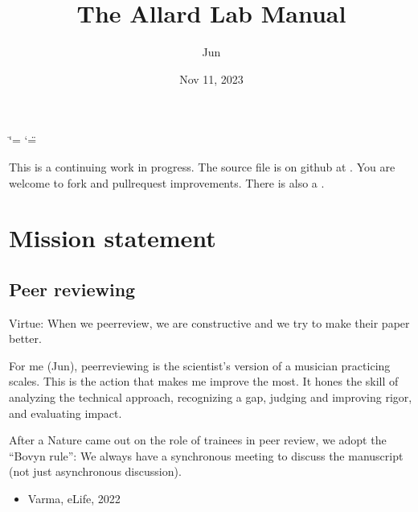 \documentclass[letterpaper,10pt,english]{sphinxmanual}
\title{The Allard Lab Manual}
\date{Nov 11, 2023}
\author{Jun}
\begin{document}
\ifdefined\shorthandoff
  \ifnum\catcode`\=\string=\active\shorthandoff{=}\fi
  \ifnum\catcode`\"=\active{}\fi
\fi

\pagestyle{empty}
\sphinxmaketitle
\pagestyle{plain}
\sphinxtableofcontents
\pagestyle{normal}
\label{\detokenize{index::doc}}


\sphinxAtStartPar
This is a continuing work in progress.
The source file is on github at .
You are welcome to fork and pull\sphinxhyphen{}request improvements.
There is also a .

\sphinxstepscope


\chapter{Mission statement}
\label{\detokenize{01OurMission:mission-statement}}\label{\detokenize{01OurMission::doc}}
\sphinxstepscope


\section{Peer reviewing}
\label{\detokenize{PeerReviewing:peer-reviewing}}\label{\detokenize{PeerReviewing:id1}}\label{\detokenize{PeerReviewing::doc}}
\sphinxAtStartPar
Virtue: When we peer\sphinxhyphen{}review, we are constructive and we try to make their paper better.

\sphinxAtStartPar
For me (Jun), peer\sphinxhyphen{}reviewing is the scientist’s version of a musician practicing scales. This is the action that makes me improve the most. It hones the skill of analyzing the technical approach, recognizing a gap, judging and improving rigor, and evaluating impact.

\sphinxAtStartPar
After a Nature  came out on the role of trainees in peer review, we adopt the “Bovyn rule”: We always have a synchronous meeting to discuss the manuscript (not just asynchronous discussion).
\begin{itemize}
\item {} 
\sphinxAtStartPar
Varma,  eLife, 2022

\end{itemize}
\end{document}
